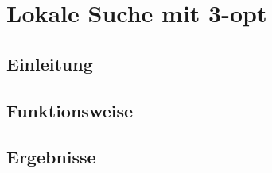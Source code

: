 \section{Lokale Suche mit 3-opt}
\subsection{Einleitung}
\subsection{Funktionsweise}
\subsection{Ergebnisse}
